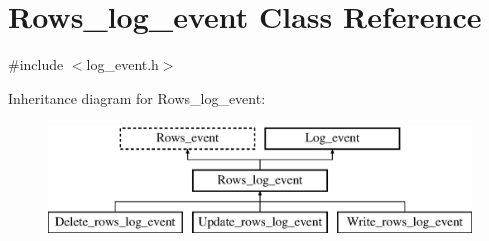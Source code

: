 \hypertarget{classRows__log__event}{}\section{Rows\+\_\+log\+\_\+event Class Reference}
\label{classRows__log__event}


{\ttfamily \#include $<$log\+\_\+event.\+h$>$}

Inheritance diagram for Rows\+\_\+log\+\_\+event\+:\begin{figure}[H]
\begin{center}
\leavevmode
\includegraphics[height=3.000000cm]{classRows__log__event}
\end{center}
\end{figure}
